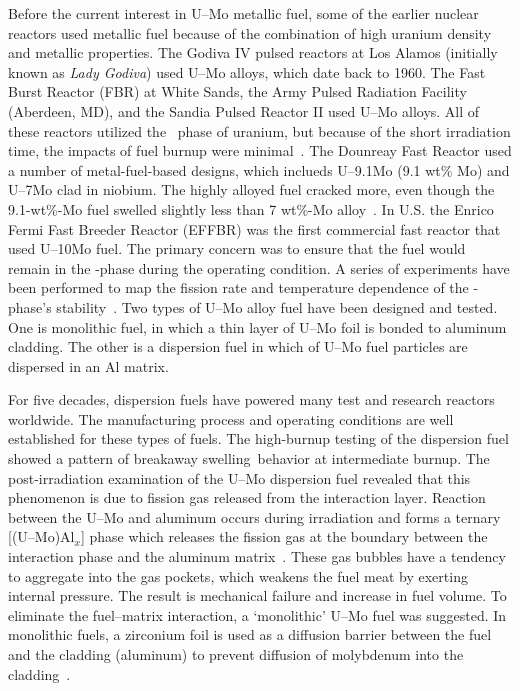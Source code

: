 Before the current interest in U--Mo metallic fuel, some of the earlier nuclear reactors used metallic fuel because of the combination of high uranium density and metallic properties. The Godiva IV pulsed reactors at Los Alamos (initially known as \textit{Lady Godiva}) used U--Mo alloys, which date back to 1960. The Fast Burst Reactor (FBR) at White Sands, the Army Pulsed Radiation Facility (Aberdeen, MD), and the Sandia Pulsed Reactor II used U--Mo alloys. All of these reactors utilized the \textgamma~phase of uranium, but because of the short irradiation time, the impacts of fuel burnup were minimal~\cite{horak1973operating}. The Dounreay Fast Reactor used a number of metal-fuel-based designs, which inclueds U--9.1Mo (9.1 wt\% Mo) and U--7Mo clad in niobium. The highly alloyed fuel cracked more, even though the 9.1-wt\%-Mo fuel swelled slightly less than 7 wt\%-Mo alloy~\cite{cottrell1964development}. In U.S. the Enrico Fermi Fast Breeder Reactor (EFFBR) was the first commercial fast reactor that used U--10Mo fuel. The primary concern was to ensure that the fuel would remain in the \textgamma-phase during the operating condition. A series of experiments have been performed to map the fission rate and temperature dependence of the \textgamma-phase's stability~\cite{no20031374}. Two types of U--Mo alloy fuel have been designed and tested. One is monolithic fuel, in which a thin layer of U--Mo foil is bonded to aluminum cladding. The other is a dispersion fuel in which of U--Mo fuel particles are dispersed in an Al matrix.

 

For five decades, dispersion fuels have powered many test and research reactors worldwide. The manufacturing process and operating conditions are well established for these types of fuels. The high-burnup testing of the dispersion fuel showed a pattern of \mbox{breakaway} swelling~\footnotemark\@ behavior at intermediate burnup. The post-irradiation examination of the U--Mo dispersion fuel revealed that this phenomenon is due to fission gas released from the interaction layer. Reaction between the U--Mo and aluminum occurs during irradiation and forms a ternary [(U--Mo)Al$_x$] phase which releases the fission gas at the boundary between the interaction phase and the aluminum matrix~\cite{leenaers2004post,jue2014microstructural,van2008transmission, olander2009growth}. These gas bubbles have a tendency to aggregate into the gas pockets, which weakens the fuel meat by exerting internal pressure. The result is mechanical failure and increase in fuel volume. To eliminate the fuel--matrix interaction, a `monolithic' U--Mo fuel was suggested. In monolithic fuels, a zirconium foil is used as a diffusion barrier between the fuel and the cladding (aluminum) to prevent diffusion of molybdenum into the cladding~\cite{jue2014microstructural}.

